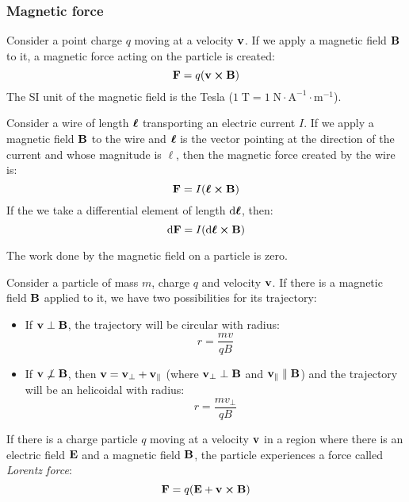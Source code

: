 \documentclass[../../../main.tex]{subfiles}
\begin{document}
\begin{multicols}{2}
  \subsubsection{Magnetic force}
  \begin{prop}
    Consider a point charge $q$ moving at a velocity $\boldsymbol{\mathrm{v}}$. If we apply a magnetic field $\boldsymbol{\mathrm{B}}$ to it, a magnetic force acting on the particle is created: $$\vectorfunction{F}=q(\vectorfunction{v}\crossprod\vectorfunction{B})$$ The SI unit of the magnetic field is the Tesla ($1\;\text{T}=1\;\text{N}\cdot\text{A}^{-1}\cdot\text{m}^{-1}$).
  \end{prop}
  \begin{prop}
    Consider a wire of length $\boldsymbol{\mathrm{\ell}}$ transporting an electric current $I$. If we apply a magnetic field $\boldsymbol{\mathrm{B}}$ to the wire and $\boldsymbol{\mathrm{\ell}}$ is the vector pointing at the direction of the current and whose magnitude is $\ell$, then the magnetic force created by the wire is: $$\vectorfunction{F}=I(\vectorfunction{\ell}\crossprod\vectorfunction{B})$$ If the we take a differential element of length $\dd\boldsymbol{\mathrm{\ell}}$, then: $$\dd \vectorfunction{F}=I(\dd\vectorfunction{\ell}\crossprod\vectorfunction{B})$$
  \end{prop}
  \begin{lemma}
    The work done by the magnetic field on a particle is zero.
  \end{lemma}
  \begin{prop}
    Consider a particle of mass $m$, charge $q$ and velocity $\boldsymbol{\mathrm{v}}$. If there is a magnetic field $\boldsymbol{\mathrm{B}}$ applied to it, we have two possibilities for its trajectory:
    \begin{itemize}
      \item If $\boldsymbol{\mathrm{v}}\perp\boldsymbol{\mathrm{B}}$, the trajectory will be circular with radius: $$r=\frac{mv}{qB}$$
      \item If $\boldsymbol{\mathrm{v}}\not\perp\boldsymbol{\mathrm{B}}$, then $\boldsymbol{\mathrm{v}}=\boldsymbol{\mathrm{v}}_\perp+\boldsymbol{\mathrm{v}}_\parallel$ (where $\boldsymbol{\mathrm{v}}_\perp\perp\boldsymbol{\mathrm{B}}$ and $\boldsymbol{\mathrm{v}}_\parallel\parallel\boldsymbol{\mathrm{B}}$) and the trajectory will be an helicoidal with radius: $$r=\frac{mv_\perp}{qB}$$
    \end{itemize}
  \end{prop}
  \begin{prop}
    If there is a charge particle $q$ moving at a velocity $\boldsymbol{\mathrm{v}}$ in a region where there is an electric field $\boldsymbol{\mathrm{E}}$ and a magnetic field $\boldsymbol{\mathrm{B}}$, the particle experiences a force called \textit{Lorentz force}: $$\vectorfunction{F}=q(\vectorfunction{E}+\vectorfunction{v}\crossprod\vectorfunction{B})$$
  \end{prop}

\end{multicols}
\end{document}
